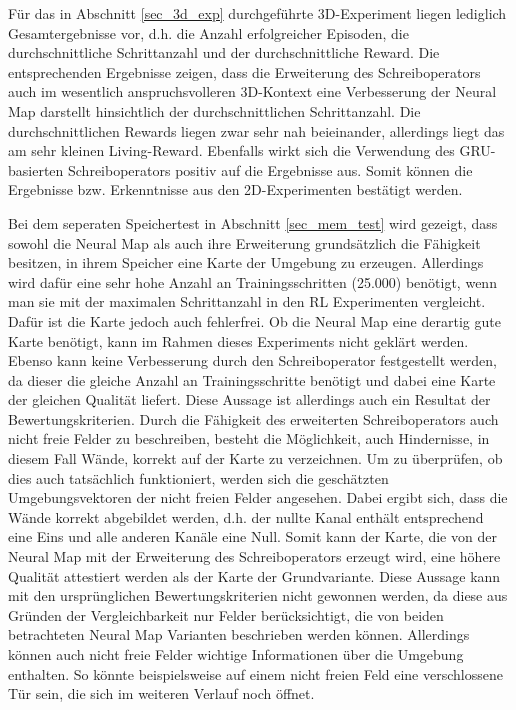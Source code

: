 Für das in Abschnitt \ref{sec_3d_exp} durchgeführte 3D-Experiment liegen lediglich Gesamtergebnisse vor, d.h. die Anzahl erfolgreicher Episoden, die durchschnittliche Schrittanzahl und der durchschnittliche Reward. Die entsprechenden Ergebnisse zeigen, dass die Erweiterung des Schreiboperators auch im wesentlich anspruchsvolleren 3D-Kontext eine Verbesserung der Neural Map darstellt hinsichtlich der durchschnittlichen Schrittanzahl. Die durchschnittlichen Rewards liegen zwar sehr nah beieinander, allerdings liegt das am sehr kleinen Living-Reward. Ebenfalls wirkt sich die Verwendung des GRU-basierten Schreiboperators positiv auf die Ergebnisse aus. Somit können die Ergebnisse bzw. Erkenntnisse aus den 2D-Experimenten bestätigt werden.

Bei dem seperaten Speichertest in Abschnitt \ref{sec_mem_test} wird gezeigt, dass sowohl die Neural Map als auch ihre Erweiterung grundsätzlich die Fähigkeit besitzen, in ihrem Speicher eine Karte der Umgebung zu erzeugen. Allerdings wird dafür eine sehr hohe Anzahl an Trainingsschritten (25.000) benötigt, wenn man sie mit der maximalen Schrittanzahl in den RL Experimenten vergleicht. Dafür ist die Karte jedoch auch fehlerfrei. Ob die Neural Map eine derartig gute Karte benötigt, kann im Rahmen dieses Experiments nicht geklärt werden. Ebenso kann keine Verbesserung durch den Schreiboperator festgestellt werden, da dieser die gleiche Anzahl an Trainingsschritte benötigt und dabei eine Karte der gleichen Qualität liefert. Diese Aussage ist allerdings auch ein Resultat der Bewertungskriterien. Durch die Fähigkeit des erweiterten Schreiboperators auch nicht freie Felder zu beschreiben, besteht die Möglichkeit, auch Hindernisse, in diesem Fall Wände, korrekt auf der Karte zu verzeichnen. Um zu überprüfen, ob dies auch tatsächlich funktioniert, werden sich die geschätzten Umgebungsvektoren der nicht freien Felder angesehen. Dabei ergibt sich, dass die Wände korrekt abgebildet werden, d.h. der nullte Kanal enthält entsprechend eine Eins und alle anderen Kanäle eine Null. Somit kann der Karte, die von der Neural Map mit der Erweiterung des Schreiboperators erzeugt wird, eine höhere Qualität attestiert werden als der Karte der Grundvariante. Diese Aussage kann mit den ursprünglichen Bewertungskriterien nicht gewonnen werden, da diese aus Gründen der Vergleichbarkeit nur Felder berücksichtigt, die von beiden betrachteten Neural Map Varianten beschrieben werden können. Allerdings können auch nicht freie Felder wichtige Informationen über die Umgebung enthalten. So könnte beispielsweise auf einem nicht freien Feld eine verschlossene Tür sein, die sich im weiteren Verlauf noch öffnet.


